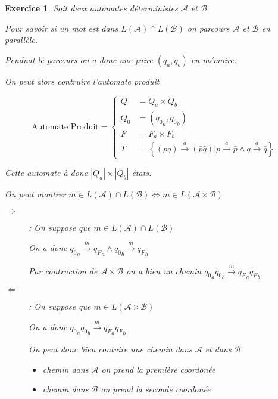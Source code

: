 \documentclass{article}
\theoremstyle{plain}
\newtheorem{exo}{Exercice}%
\begin{document}
\begin{exo} Soit deux automates déterministes $\mathcal{A}$ et $\mathcal{B}$

  Pour savoir si un mot est dans $L(\mathcal{A}) \cap L(\mathcal{B})$ 
  on parcours $\mathcal{A}$ et $\mathcal{B}$ en parallèle.

  Pendnat le parcours on a donc une paire $(q_a, q_b)$ en mémoire.

  On peut alors contruire l'automate produit
  
  \[\text{Automate Produit} =
    \begin{cases}
      Q   &= Q_a \times Q_b \\
      Q_0 &= ({q_0}_a, {q_0}_b) \\
      F   &= F_a \times F_b \\
      T   &= \left\{(pq) \overset{a}{\to} (\bar{p}\bar{q}) 
                | p \overset{a}{\to} \bar{p} \land q \overset{a}{\to} \bar{q} \right\}    
    \end{cases}  
  \]

  Cette automate à donc $|Q_a| \times |Q_b|$ états.

  On peut montrer $m \in L(\mathcal{A}) \cap L(\mathcal{B}) 
          \Leftrightarrow m \in L(\mathcal{A} \times \mathcal{B})$

    \begin{description}
      \item[$\Rightarrow$]: On suppose que $m \in L(\mathcal{A}) \cap L(\mathcal{B})$

        On a donc ${q_0}_a \overset{m}{\to} {q_F}_a \land {q_0}_b \overset{m}{\to} {q_F}_b$

        Par contruction de $\mathcal{A} \times \mathcal{B}$ on a bien un chemin 
        ${q_0}_a {q_0}_b \overset{m}{\to} {q_F}_a {q_F}_b$

      \item[$\Leftarrow$]: On suppose que $m \in L(\mathcal{A} \times \mathcal{B})$

        On a donc ${q_0}_a {q_0}_b \overset{m}{\to} {q_F}_a {q_F}_b$

        On peut donc bien contuire une chemin dans $\mathcal{A}$ et dans $\mathcal{B}$

        \begin{itemize}
          \item chemin dans $\mathcal{A}$ on prend la première coordonée

          \item chemin dans $\mathcal{B}$ on prend la seconde coordonée
        \end{itemize}


\end{description}
\end{exo}
\end{document}
